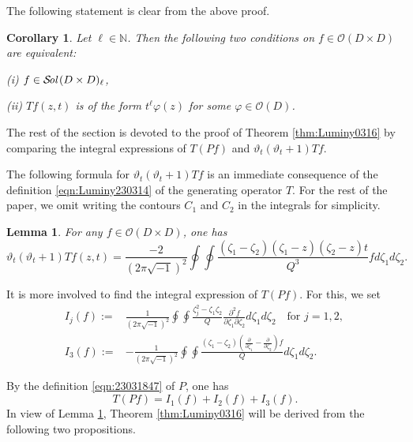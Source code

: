 \documentclass[12pt,leqno]{amsart}
\theoremstyle{plain}
\newtheorem{corollary}[thm]{Corollary}
\newtheorem{lemma}[thm]{Lemma}
\theoremstyle{definition}
\newcommand\Sol{{\mathcal {S}}\!{\text{\it{ol}}}\,}
\begin{document}
The following statement is clear from the above proof.  

\begin{corollary}
\label{cor:Luminy0316}
Let $\ell \in {\mathbb{N}}$.  
Then the following two conditions on $f \in {\mathcal{O}}(D \times D)$ are equivalent:
\par\noindent
{\rm{(i)}}\enspace
$f \in \Sol(D \times D)_{\ell}$, 
\par\noindent
{\rm{(ii)}}\enspace
$T f (z,t)$ is of the form $t^{\ell} \varphi (z)$
 for some $\varphi \in {\mathcal{O}}(D)$.    
\end{corollary}


The rest of the section is devoted to the proof of Theorem \ref{thm:Luminy0316}
 by comparing the integral expressions
 of $T(P f)$ and $\vartheta_t(\vartheta_t+1)T f$.



The following formula for $\vartheta_t (\vartheta_t+1)T f$ is an immediate consequence
 of the definition \eqref{eqn:Luminy230314} 
 of the generating operator $T$.  
For the rest of the paper, 
 we omit writing the contours $C_1$ and $C_2$ in the integrals for simplicity.  

\begin{lemma}
\label{lem:23031632}
For any $f \in {\mathcal{O}}(D \times D)$, 
 one has
\[
\vartheta_t (\vartheta_t+1) T f(z,t)
=\frac{-2}{(2\pi \sqrt{-1})^2}
\oint \oint
\frac{(\zeta_1-\zeta_2)(\zeta_1-z)(\zeta_2-z)t}{Q^3}f d \zeta_1 d \zeta_2.  
\]
\end{lemma}



It is more involved to find the integral expression of $T(P f)$.  
For this, 
 we set
\begin{align*}
I_j(f)
:=& \frac{1}{(2 \pi \sqrt{-1})^2} \oint\oint \frac {\zeta_j^2 - \zeta_1 \zeta_2}Q 
                     \frac{\partial^2 f}{\partial \zeta_1 \partial \zeta_2} d \zeta_1 d \zeta_2
\quad
\text{for $j=1,2$, }
\\
I_3(f):=& -\frac {1}{(2\pi \sqrt{-1})^2}
       \oint \oint \frac{(\zeta_1-\zeta_2) (\frac{\partial}{\partial \zeta_1} - \frac{\partial}{\partial \zeta_2})f} Q d \zeta_1 d \zeta_2.  
\end{align*}

By the definition \eqref{eqn:23031847} of $P$, 
one has 
\[
   T(P f)= I_1(f)+I_2(f)+I_3(f).  
\]
In view of Lemma \ref{lem:23031632}, 
 Theorem \ref{thm:Luminy0316} will be derived from
 the following two propositions.  
\end{document}
